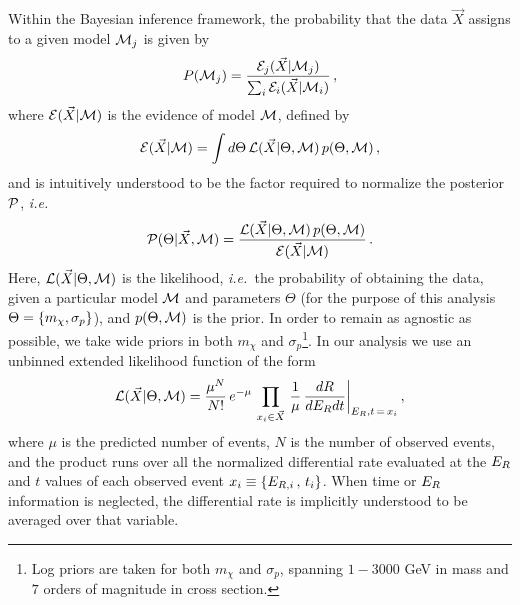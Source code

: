 \documentclass[11pt]{article}
\newcommand{\ie}{{\it i.e.~}}  \newcommand{\eg}{{\it e.g.~}}
\begin{document}
Within the Bayesian inference framework, the probability that the data $\vec{X}$ assigns to a given model ${\cal M}_j$ is given by
\begin{equation}\label{eq:probs}
P({\cal M}_j) = \frac{{\cal E}_j(\vec{X}|{\cal M}_j)}{\sum_i {\cal E}_i(\vec{X}|{\cal M}_i)} \, ,
\end{equation}
where ${\cal E}(\vec{X}|{\cal M})$ is the evidence of model ${\cal M}$, defined by
\begin{equation}\label{eq:evidence}
{\cal E}(\vec{X}|{\cal M}) = \int d\Theta \, {\cal L}(\vec{X}|\Theta,{\cal M}) \, p(\Theta,{\cal M}) \, ,
\end{equation}
and is intuitively understood to be the factor required to normalize the posterior ${ \cal P}$, \ie
\begin{equation}\label{eq:posterior}
{ \cal P}(\Theta | \vec{X}, {\cal M}) = \frac{{\cal L}(\vec{X}|\Theta,{\cal M})\, p(\Theta,{\cal M})}{{\cal E}(\vec{X}|{\cal M})} \, . 
\end{equation}
Here, ${\cal L}(\vec{X}|\Theta,{\cal M})$ is the likelihood, \ie the probability of obtaining the data, given a particular model ${\cal M}$ and parameters $\Theta$ (for the purpose of this analysis $\Theta = \left\{ m_\chi, \sigma_p \right\}$), and $p(\Theta, {\cal M})$ is the prior. In order to remain as agnostic as possible, we take wide priors in both $m_\chi$ and $\sigma_p$\footnote{Log priors are taken for both $m_\chi$ and $\sigma_p$, spanning $1-3000$ GeV in mass and $7$ orders of magnitude in cross section.}. In our analysis we use an unbinned extended likelihood function of the form
\begin{equation}\label{eq:likelihood}
{\cal L}(\vec{X}|\Theta,{\cal M}) = \frac{\mu^N}{N!} \, e^{-\mu} \, \prod_{x_i \in \vec{X}}\, \frac{1}{\mu} \, \frac{dR}{dE_R dt} \bigg|_{E_R,t \, = \, x_i} \, ,
\end{equation}
where $\mu$ is the predicted number of events, $N$ is the number of observed events, and the product runs over all the normalized differential rate evaluated at the $E_R$ and $t$ values of each observed event $x_i \equiv \left\{ E_{R,i} \, , \, t_i \right\}$. When time or $E_R$ information is neglected, the differential rate is implicitly understood to be averaged over that variable. 
\end{document}
